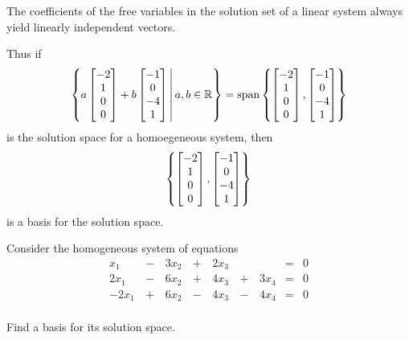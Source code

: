 \begin{fact}
  The coefficients of the free variables in the solution set of a linear system
  always yield linearly independent vectors.

  \vspace{1em}

  Thus if
  \[
    \left\{
      a \begin{bmatrix} -2 \\ 1 \\ 0 \\ 0\end{bmatrix} +
      b \begin{bmatrix} -1 \\ 0 \\ -4 \\ 1 \end{bmatrix}
    \,\middle|\,
      a,b \in \mathbb{R}
    \right\} = \operatorname{span}\left\{ \begin{bmatrix} -2 \\ 1 \\ 0 \\ 0\end{bmatrix}, 
					 \begin{bmatrix} -1 \\ 0 \\ -4 \\ 1 \end{bmatrix} \right\}
  \]
  is the solution space for a homoegeneous system, then
  \[
    \left\{
      \begin{bmatrix} -2 \\ 1 \\ 0 \\ 0\end{bmatrix},
      \begin{bmatrix} -1 \\ 0 \\ -4 \\ 1 \end{bmatrix}
    \right\}
  \]
  is a basis for the solution space.
\end{fact}

\begin{activity}{10}
Consider the homogeneous system of equations
\begin{alignat*}{5}
x_1&\,-\,&3x_2&\,+\,& 2x_3&\,\,&  &=& 0 \\
2x_1&\,-\,&6x_2&\,+\,&4x_3 &\,+\,&3 x_4 &=& 0 \\
-2x_1&\,+\,&6x_2&\,-\,&4x_3 &\,-\,&4 x_4 &=& 0 \\
\end{alignat*}

Find a basis for its solution space.
\end{activity}

